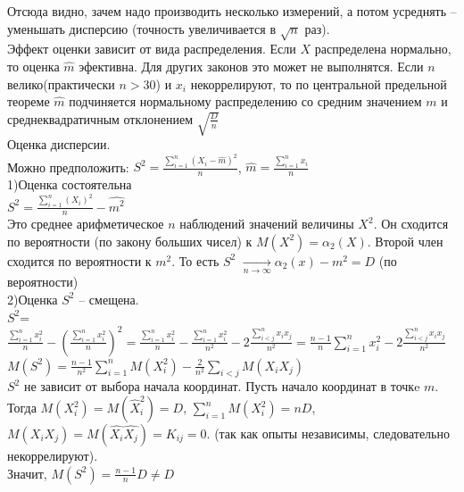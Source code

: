 \documentclass[russian, 12pt, fleqn]{article}
\begin{document}
Отсюда видно, зачем надо производить несколько измерений, а потом усреднять -- уменьшать дисперсию (точность увеличивается  в $\sqrt{n}$ раз).\\
Эффект оценки зависит от вида распределения. Если $X$ распределена нормально, то оценка $\hat{m}$ эфективна.  Для других законов это может не выполнятся. Если $n$
велико(практически $n>30$) и $x_i$ некоррелируют, то по центральной предельной теореме $\hat{m}$ подчиняется нормальному распределению со средним значением $m$ и среднеквадратичным отклонением $\sqrt{\frac{D}{n}}$\\
Оценка дисперсии.\\
Можно предположить: $ S^2 = \frac{ \displaystyle{\sum \limits_{i = 1}^{n}} (X_i - \hat{m})^2 }{n}$, $\hat{m} = \frac{ \displaystyle{\sum \limits_{i = 1}^{n}} x_i}{n}$\\
1)Оценка состоятельна\\
$S^2=\frac{ \displaystyle{\sum \limits_{i = 1}^{n}} (X_i)^2 }{n}- \hat{m^2}$\\
Это среднее  арифметическое $n$ наблюдений значений величины $X^2$. Он сходится по вероятности (по закону больших чисел) к $M(X^2) = \alpha_2(X)$. Второй член сходится по вероятности к $m^2$. То есть $S^2$ $\displaystyle{\underset{n \rightarrow \infty}{\rightarrow}} \alpha_2(x) - m^2 = D$ (по вероятности)\\
2)Оценка $S^2$ -- смещена.\\
$S^2$= $\frac{ \displaystyle{\sum \limits_{i = 1}^{n}}x_i^2 }{n} - ( \frac{ \displaystyle{\sum \limits_{i = 1}^{n}}x_i^2 }{n})^2 = \frac{ \displaystyle{\sum \limits_{i = 1}^{n}}x_i^2 }{n}  - \frac{ \displaystyle{\sum \limits_{i = 1}^{n}}x_i^2 }{n^2} - 2 \frac{ \displaystyle{\sum \limits_{i < j}^{n}}x_ix_j }{n^2}  = \frac{n - 1}{n} \displaystyle{\sum \limits_{i = 1}^{n}}x_i^2  - 2 \frac{ \displaystyle{\sum \limits_{i < j}^{n}}x_ix_j }{n^2}  $  \\
$M(S^2) = \frac{n - 1}{n^2}  \displaystyle{\sum \limits_{i = 1}^{n}}M(X_i^2) - \frac{2}{n^2}  \displaystyle{\sum \limits_{i < j}^{}} M(X_iX_j)$\\
$S^2$ не зависит от выбора начала координат. Пусть начало координат в точкe $m$. Тогда $M(X_i^2) = M(\hat{X}_i^2) =D$, $ \displaystyle{\sum \limits _{i=1} ^ {n}} M(X_i^2) = nD$, $M(X_iX_j) = M(\hat{X_i}\hat{X_j}) = K_{ij} = 0$. (так как опыты независимы, следовательно некоррелируют).\\
Значит, $M(S^2) = \frac{n - 1}{n} D \neq D$\\
\\
\end{document}
